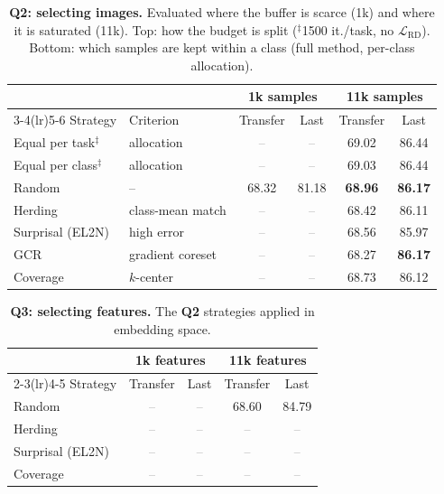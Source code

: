 \documentclass[10pt,twocolumn,letterpaper]{article}
\newcommand{\Q}[1]{\textbf{Q#1}\xspace}     %
\newcommand{\Lrd}{\mathcal{L}_{\text{RD}}}
\newcommand{\tbd}{\textcolor{gray}{--}}          %
\newcommand{\best}[1]{\textbf{#1}}
\begin{document}
\begin{table}[t]
\centering
\small
\setlength{\tabcolsep}{3.5pt}
\caption{\textbf{\Q{2}: selecting images.} Evaluated where the buffer is
scarce (1k) and where it is saturated (11k). Top: how the budget is split
($^\ddagger$1500 it./task, no $\Lrd$). Bottom: which samples are kept within a
class (full method, per-class allocation).}
\label{tab:q2b}
\begin{tabular}{@{}ll cc cc@{}}
\toprule
& & \multicolumn{2}{c}{1k samples} & \multicolumn{2}{c}{11k samples} \\
\cmidrule(lr){3-4}\cmidrule(lr){5-6}
Strategy & Criterion & Transfer & Last & Transfer & Last \\
\midrule
Equal per task$^\ddagger$  & allocation & \tbd & \tbd & 69.02 & 86.44 \\
Equal per class$^\ddagger$ & allocation & \tbd & \tbd & 69.03 & 86.44 \\
\midrule
Random            & --                 & 68.32 & 81.18 & \best{68.96} & \best{86.17} \\
Herding           & class-mean match   & \tbd & \tbd & 68.42 & 86.11 \\
Surprisal (EL2N)  & high error         & \tbd & \tbd & 68.56 & 85.97 \\
GCR               & gradient coreset   & \tbd & \tbd & 68.27 & \best{86.17} \\
Coverage          & $k$-center         & \tbd & \tbd & 68.73 & 86.12 \\
\bottomrule
\end{tabular}
\end{table}

\begin{table}[t]
\centering
\small
\setlength{\tabcolsep}{3.5pt}
\caption{\textbf{\Q{3}: selecting features.} The \Q{2} strategies applied
in embedding space.}
\label{tab:q3c}
\begin{tabular}{@{}l cc cc@{}}
\toprule
& \multicolumn{2}{c}{1k features} & \multicolumn{2}{c}{11k features} \\
\cmidrule(lr){2-3}\cmidrule(lr){4-5}
Strategy & Transfer & Last & Transfer & Last \\
\midrule
Random            & \tbd & \tbd & 68.60 & 84.79 \\
Herding           & \tbd & \tbd & \tbd & \tbd \\
Surprisal (EL2N)  & \tbd & \tbd & \tbd & \tbd \\
Coverage          & \tbd & \tbd & \tbd & \tbd \\
\bottomrule
\end{tabular}
\end{table}
\end{document}
